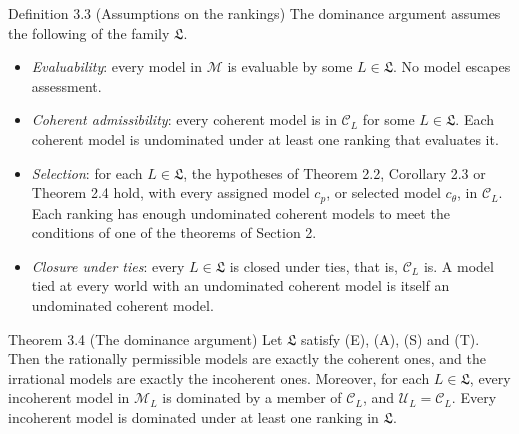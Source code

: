 \documentclass[11pt]{article}
\newcommand{\M}{\mathcal M}
\newcommand{\C}{\mathcal C}
\newcommand{\U}{\mathcal U}
\newcommand{\Lf}{\mathfrak L}
\begin{document}
\begin{stmt}{Definition 3.3 (Assumptions on the rankings)}
The dominance argument assumes the following of the family $\Lf$.
\begin{itemize}[leftmargin=2.4em,labelsep=0.5em]
\item[\textbf{(E)}] \emph{Evaluability}: every model in $\M$ is evaluable by some $L\in\Lf$. No model escapes assessment.
\item[\textbf{(A)}] \emph{Coherent admissibility}: every coherent model is in $\C_L$ for some $L\in\Lf$. Each coherent model is undominated under at least one ranking that evaluates it.
\item[\textbf{(S)}] \emph{Selection}: for each $L\in\Lf$, the hypotheses of Theorem 2.2, Corollary 2.3 or Theorem 2.4 hold, with every assigned model $c_p$, or selected model $c_\theta$, in $\C_L$. Each ranking has enough undominated coherent models to meet the conditions of one of the theorems of Section 2.
\item[\textbf{(T)}] \emph{Closure under ties}: every $L\in\Lf$ is closed under ties, that is, $\C_L$ is. A model tied at every world with an undominated coherent model is itself an undominated coherent model.
\end{itemize}
\end{stmt}

\begin{stmt}{Theorem 3.4 (The dominance argument)}
Let $\Lf$ satisfy (E), (A), (S) and (T). Then the rationally permissible models are exactly the coherent ones, and the irrational models are exactly the incoherent ones. Moreover, for each $L\in\Lf$, every incoherent model in $\M_L$ is dominated by a member of $\C_L$, and $\U_L=\C_L$. Every incoherent model is dominated under at least one ranking in $\Lf$.
\end{stmt}
\end{document}
